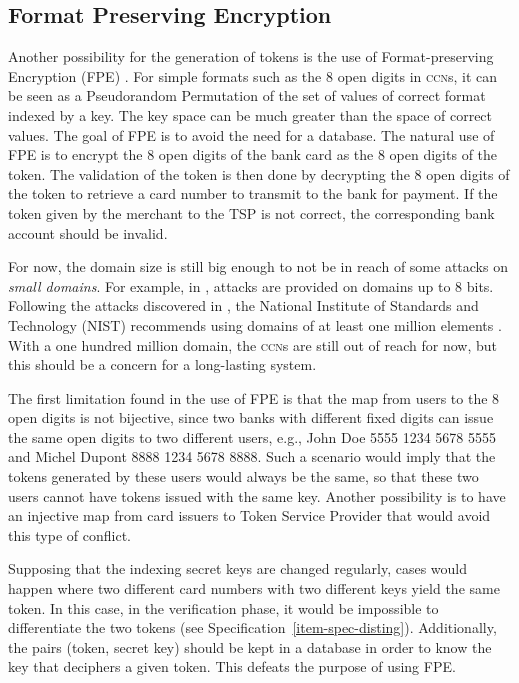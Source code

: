 \documentclass{llncs}
\begin{document}
\subsection{Format Preserving Encryption}

Another possibility for the generation of tokens is the use of Format-preserving Encryption (FPE) \cite{Bellare2009}. For simple formats such as the 8 open digits in \textsc{ccn}s, it can be seen as a Pseudorandom Permutation of the set of values of correct format indexed by a key. The key space can be much greater than the space of correct values. The goal of FPE is to avoid the need for a database. The natural use of FPE is to encrypt the 8 open digits of the bank card as the 8 open digits of the token. The validation of the token is then done by decrypting the 8 open digits of the token to retrieve a card number to transmit to the bank for payment. If the token given by the merchant to the TSP is not correct, the corresponding bank account should be invalid.

For now, the domain size is still big enough to not be in reach of some attacks on \textit{small domains}. For example, in \cite{attacksFPEsmallDomains}, attacks are provided on domains up to 8 bits. Following the attacks discovered in \cite{FPEattacks}, the National Institute of Standards and Technology (NIST) recommends using domains of at least one million elements \cite{NistFPErecommandations}. With a one hundred million domain, the \textsc{ccn}s  are still out of reach for now, but this should be a concern for a long-lasting system.

The first limitation found in the use of FPE is that the map from users to the 8 open digits is not bijective, since two banks with different fixed digits can issue the same open digits to two different users, e.g., John Doe 5555 1234 5678 5555 and Michel Dupont 8888 1234 5678 8888. Such a scenario would imply that the tokens generated by these users would always be the same, so that these two users cannot have tokens issued with the same key. Another possibility is to have an injective map from card issuers to Token Service Provider that would avoid this type of conflict.

Supposing that the indexing secret keys are changed regularly, cases would happen where two different card numbers with two different keys yield the same token. In this case, in the verification phase, it would be impossible to differentiate the two tokens (see Specification~\ref{item-spec-disting}). Additionally, the pairs (token, secret key) should be kept in a database in order to know the key that deciphers a given token. This defeats the purpose of using FPE.
\end{document}
